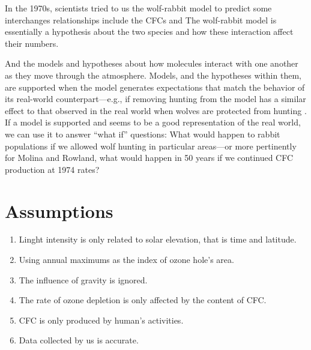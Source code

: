 \documentclass[12pt]{article}
\newtheorem{definition}{{definition}}
\newcounter{numdefinition}
\renewenvironment{definition}[1]
{\noindent\stepcounter{numdefinition}
\slshape Definition \arabic{numdefinition} \textsf{#1 :}
\begin{quote}\small\itshape}
{\end{quote}}
\begin{document}
In the 1970s, scientists tried to us the wolf-rabbit model to predict some interchanges relationships include the CFCs and  The wolf-rabbit model is essentially a hypothesis about the two species and how these interaction affect their numbers. 

And the models and hypotheses about how molecules interact with one another as they move through the atmosphere. Models, and the hypotheses within them, are supported when the model generates expectations that match the behavior of its real-world counterpart—e.g., if removing hunting from the model has a similar effect to that observed in the real world when wolves are protected from hunting . If a model is supported and seems to be a good representation of the real world, we can use it to answer “what if” questions: What would happen to rabbit populations if we allowed wolf hunting in particular areas—or more pertinently for Molina and Rowland, what would happen in 50 years if we continued CFC production at 1974 rates?



%  
%
%
%
%

\newpage
\section{Assumptions}
\begin{enumerate}
\item  Linght intensity is only related to solar elevation, that is time and latitude. 
\item Using annual maximums as the index of ozone hole's area.
\item The influence of gravity is ignored.
\item The rate of ozone depletion is only affected by the content of CFC.
\item CFC is only produced by human’s activities.
\item Data collected by us is accurate.
\end{enumerate}
\end{document}
